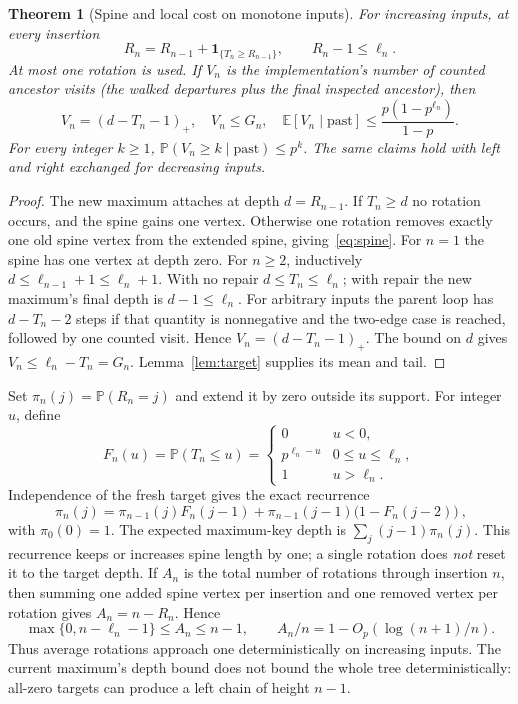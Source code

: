 \documentclass[11pt]{article}
\newtheorem{theorem}{Theorem}[section]
\newcommand{\E}{\mathbb E}
\newcommand{\Prob}{\mathbb P}
\begin{document}
\begin{theorem}[Spine and local cost on monotone inputs]\label{thm:monotone}
For increasing inputs, at every insertion
\begin{equation}
 R_n=R_{n-1}+\mathbf1_{\{T_n\ge R_{n-1}\}},\qquad
 R_n-1\le\ell_n.                                             \label{eq:spine}
\end{equation}
At most one rotation is used. If $V_n$ is the implementation's number of counted
ancestor visits (the walked departures plus the final inspected ancestor), then
\begin{equation}
 V_n=(d-T_n-1)_+,\quad V_n\le G_n,\quad
 \E[V_n\mid\text{past}]\le\frac{p(1-p^{\ell_n})}{1-p}.
                                                               \label{eq:mono-visits}
\end{equation}
For every integer $k\ge1$, $\Prob(V_n\ge k\mid\text{past})\le p^k$.
The same claims hold with left and right exchanged for decreasing inputs.
\end{theorem}
\begin{proof}
The new maximum attaches at depth $d=R_{n-1}$. If $T_n\ge d$ no rotation
occurs, and the spine gains one vertex. Otherwise one rotation removes exactly
one old spine vertex from the extended spine, giving~\eqref{eq:spine}.
For $n=1$ the spine has one vertex at depth zero. For $n\ge2$,
inductively $d\le\ell_{n-1}+1\le\ell_n+1$. With no repair $d\le T_n\le\ell_n$;
with repair the new maximum's final depth is $d-1\le\ell_n$.
For arbitrary inputs the parent loop has $d-T_n-2$ steps if that quantity is
nonnegative and the two-edge case is reached, followed by one counted visit.
Hence $V_n=(d-T_n-1)_+$. The bound on $d$ gives $V_n\le\ell_n-T_n=G_n$.
Lemma~\ref{lem:target} supplies its mean and tail.
\end{proof}

Set $\pi_n(j)=\Prob(R_n=j)$ and extend it by zero outside its support. For integer $u$, define
\[
 F_n(u)=\Prob(T_n\le u)=
 \begin{cases}0&u<0,\\p^{\ell_n-u}&0\le u\le\ell_n,\\1&u>\ell_n.\end{cases}
\]
Independence of the fresh target gives the exact recurrence
\begin{equation}
 \boxed{\ \pi_n(j)=\pi_{n-1}(j)F_n(j-1)
       +\pi_{n-1}(j-1)\bigl(1-F_n(j-2)\bigr)\ },             \label{eq:spine-law}
\end{equation}
with $\pi_0(0)=1$. The expected maximum-key depth is
$\sum_j(j-1)\pi_n(j)$. This recurrence keeps or increases spine length by one;
a single rotation does \emph{not} reset it to the target depth.
If $A_n$ is the total number of rotations through insertion $n$, then summing
one added spine vertex per insertion and one removed vertex per rotation gives
$A_n=n-R_n$. Hence
\[
 \max\{0,n-\ell_n-1\}\le A_n\le n-1,
 \qquad A_n/n=1-O_p(\log(n+1)/n).
\]
Thus average rotations approach one deterministically on increasing inputs.
The current maximum's depth bound does not bound the whole tree deterministically:
all-zero targets can produce a left chain of height $n-1$.
\end{document}
